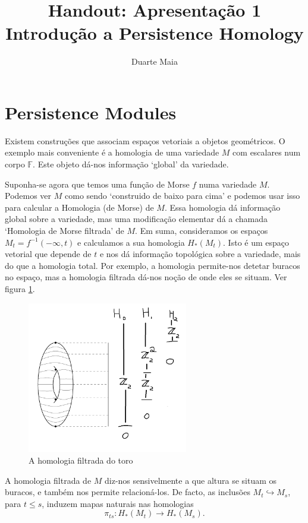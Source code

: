 \documentclass[11pt]{article}
\title{Handout: Apresentação 1\\
Introdução a Persistence Homology}
\author{Duarte Maia}
\theoremstyle{nonumberplain}
\newcommand{\FF}{\mathbb{F}}
\begin{document}

\maketitle

\section{Persistence Modules}

Existem construções que associam espaços vetoriais a objetos geométricos. O exemplo mais conveniente é a homologia de uma variedade $M$ com escalares num corpo $\FF$. Este objeto dá-nos informação `global' da variedade.

Suponha-se agora que temos uma função de Morse $f$ numa variedade $M$. Podemos ver $M$ como sendo `construido de baixo para cima' e podemos usar isso para calcular a Homologia (de Morse) de $M$. Essa homologia dá informação global sobre a variedade, mas uma modificação elementar dá a chamada `Homologia de Morse filtrada' de $M$. Em suma, consideramos os espaços $M_t = f^{-1}(-\infty, t)$ e calculamos a sua homologia $H_*(M_t)$. Isto é um espaço vetorial que depende de $t$ e nos dá informação topológica sobre a variedade, mais do que a homologia total. Por exemplo, a homologia permite-nos detetar buracos no espaço, mas a homologia filtrada dá-nos noção de onde eles se situam. Ver figura \ref{mt1}.

\begin{figure}[h]
\centering
\includegraphics[width=7cm]{mt1}
\caption{A homologia filtrada do toro}\label{mt1}
\end{figure}

A homologia filtrada de $M$ diz-nos sensivelmente a que altura se situam os buracos, e também nos permite relacioná-los. De facto, as inclusões $M_t \hookrightarrow M_s$, para $t \leq s$, induzem mapas naturais nas homologias
\begin{equation}
\pi_{ts} \colon H_*(M_t) \to H_*(M_s).
\end{equation}
\end{document}
